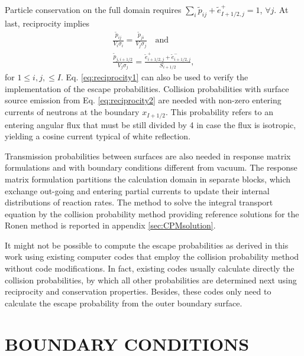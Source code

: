 \documentclass{ictt26}
\begin{document}
Particle conservation on the full domain requires $\sum_i \tilde{p}_{ij} + \tilde{e}^+_{I+1/2,j} = 1$, $\forall j$. At last, reciprocity implies
\begin{subequations}
\label{eq:reciprocity}
\begin{gather}
  \frac{\tilde{p}_{ij}}{V_i \sigma_i} = \frac{\tilde{p}_{ji}}{V_j \sigma_j} \quad \text{and} \label{eq:reciprocity1}\\
  \frac{\tilde{p}_{j, i+1/2}}{V_j \sigma_j} = \frac{\tilde{e}^+_{i+1/2, j} + \tilde{e}^-_{i+1/2, j}}{S_{i+1/2}}, %
  \label{eq:reciprocity2}
\end{gather}
\end{subequations}
for $1 \leq i,j, \leq I$. %
Eq. \ref{eq:reciprocity1} can also be used to verify the implementation of the escape probabilities. Collision probabilities with surface source emission from Eq. \ref{eq:reciprocity2} are needed with non-zero entering currents of neutrons at the boundary $x_{I+1/2}$. This probability refers to an entering angular flux that must be still divided by 4 in case the flux is isotropic, yielding a cosine current typical of white reflection.

Transmission probabilities between surfaces are also needed in response matrix formulations and with boundary conditions different from vacuum. The response matrix formulation partitions the calculation domain in separate blocks, which exchange out-going and entering partial currents to update their internal distributions of reaction rates. The method to solve the integral transport equation by the collision probability method providing reference solutions for the Ronen method is reported in appendix \ref{sec:CPMsolution}.

It might not be possible to compute the escape probabilities as derived in this work using existing computer codes that employ the collision probability method without code modifications. In fact, existing codes usually calculate directly the collision probabilities, by which all other probabilities are determined next using reciprocity and conservation properties. Besides, these codes only need to calculate the escape probability from the outer boundary surface.


\section{BOUNDARY CONDITIONS}
\label{sec:bc}
\end{document}
